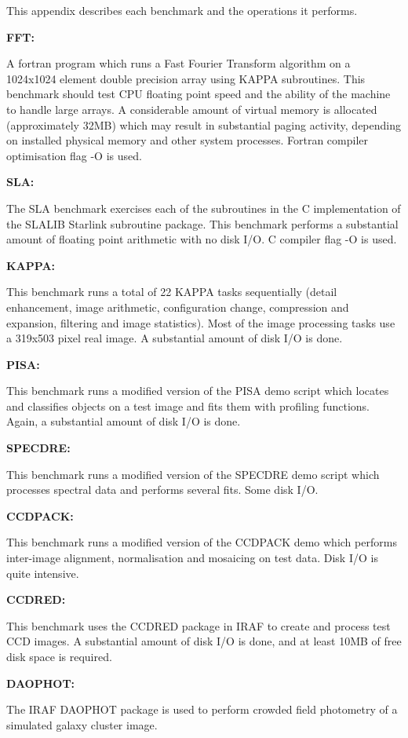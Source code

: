 This appendix describes each benchmark and the operations it performs.

{\bf FFT:}

A fortran program which runs a Fast Fourier Transform algorithm on a
1024x1024 element double precision array using KAPPA subroutines. This
benchmark should test CPU floating point speed and the ability of the
machine to handle large arrays. A considerable amount of virtual memory
is allocated (approximately 32MB) which may result in substantial
paging activity, depending on installed physical memory and other
system processes. Fortran compiler optimisation flag -O is used.

{\bf SLA:}

The SLA benchmark exercises each of the subroutines in the C
implementation of the SLALIB Starlink subroutine package. This
benchmark performs a substantial amount of floating point arithmetic
with no disk I/O. C compiler flag -O is used.

{\bf KAPPA:}

This benchmark runs a total of 22 KAPPA tasks sequentially (detail enhancement,
image arithmetic, configuration change, compression and expansion, filtering
and image statistics). Most of the image processing tasks use a 319x503 pixel
real image. A substantial amount of disk I/O is done.

{\bf PISA:}

This benchmark runs a modified version of the PISA demo script which locates
and classifies objects on a test image and fits them with profiling functions.
Again, a substantial amount of disk I/O is done.

{\bf SPECDRE:}

This benchmark runs a modified version of the SPECDRE demo script which
processes spectral data and performs several fits. Some disk I/O.

{\bf CCDPACK:}

This benchmark runs a modified version of the CCDPACK demo which performs
inter-image alignment, normalisation and mosaicing on test data. Disk I/O
is quite intensive.

{\bf CCDRED:}

This benchmark uses the CCDRED package in IRAF to create and process
test CCD images. A substantial amount of disk I/O is done, and at least
10MB of free disk space is required.

{\bf DAOPHOT:}

The IRAF DAOPHOT package is used to perform crowded field photometry of
a simulated galaxy cluster image.

